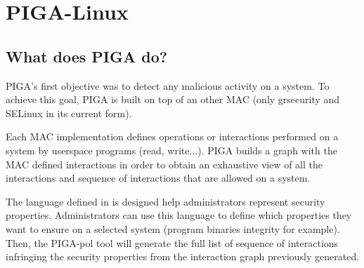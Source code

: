 \documentclass[pdftex,a4paper,titlepage,11pt]{article}
\begin{document}




\newpage

\section{PIGA-Linux}

\subsection{What does PIGA do?}

PIGA's first objective was to detect any malicious activity on a system. To
achieve this goal, PIGA is built on top of an other MAC (only grsecurity
and SELinux in its current form).

\bigskip

Each MAC implementation defines operations or interactions performed on a system
by userspace programs (read, write...). PIGA  builds a graph with the MAC
defined interactions in order to obtain an exhaustive view of all the
interactions and sequence of interactions that are allowed on a system.

\bigskip

The language defined in \cite{theseJBriffaut} is designed help administrators
represent security properties. Administrators can use this language to define
which properties they want to ensure on a selected system (program binaries
integrity for example). Then, the PIGA-pol tool will generate the full list of
sequence of interactions infringing the security properties from the interaction
graph previously generated.
\end{document}

